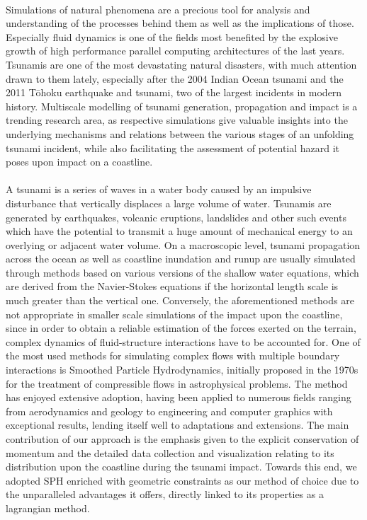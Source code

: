 \documentclass{llncs}
\begin{document}
\paragraph{} Simulations of natural phenomena are a precious tool for analysis and
understanding of the processes behind them as well as the implications of
those. Especially fluid dynamics is one of the fields most benefited by the explosive
growth of high performance parallel computing architectures of the last years. Tsunamis
are one of the most devastating natural disasters, with much attention drawn to them
lately, especially after the 2004 Indian Ocean tsunami and the 2011 T\={o}hoku earthquake
and tsunami, two of the largest incidents in modern history. Multiscale modelling of
tsunami generation, propagation and impact is a trending research area, as respective
simulations give valuable insights into the underlying mechanisms and relations between
the various stages of an unfolding tsunami incident, while also facilitating the
assessment of potential hazard it poses upon impact on a coastline.

\paragraph{} A tsunami is a series of waves in a water body caused by an impulsive
disturbance that vertically displaces a large volume of water. Tsunamis are generated by
earthquakes, volcanic eruptions, landslides and other such events which have the potential
to transmit a huge amount of mechanical energy to an overlying or adjacent water
volume. On a macroscopic level, tsunami propagation across the ocean as well as coastline
inundation and runup are usually simulated through methods based on various versions of
the shallow water equations, which are derived from the Navier-Stokes equations if the
horizontal length scale is much greater than the vertical one. Conversely, the
aforementioned methods are not appropriate in smaller scale simulations of the impact upon
the coastline, since in order to obtain a reliable estimation of the forces exerted on the
terrain, complex dynamics of fluid-structure interactions have to be accounted for. One of
the most used methods for simulating complex flows with multiple boundary interactions is
Smoothed Particle Hydrodynamics, initially proposed in the 1970s for the treatment of
compressible flows in astrophysical problems. The method has enjoyed extensive adoption,
having been applied to numerous fields ranging from aerodynamics and geology to
engineering and computer graphics with exceptional results, lending itself well to
adaptations and extensions. The main contribution of our approach is the emphasis given to
the explicit conservation of momentum and the detailed data collection and visualization
relating to its distribution upon the coastline during the tsunami impact. Towards this
end, we adopted SPH enriched with geometric constraints as our method of choice due to the
unparalleled advantages it offers, directly linked to its properties as a lagrangian
method.
\end{document}
